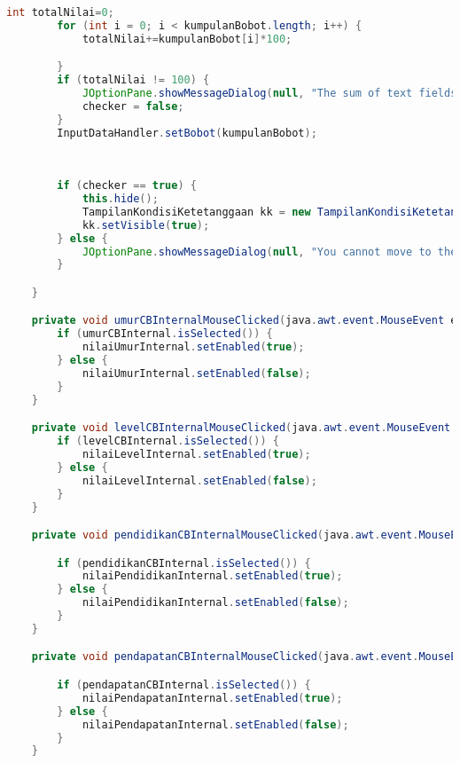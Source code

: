 \begin{lstlisting}[language=Java, caption=TampilanBobotKetetanggaan.java]
        int totalNilai=0;
        for (int i = 0; i < kumpulanBobot.length; i++) {
            totalNilai+=kumpulanBobot[i]*100;

        }
        if (totalNilai != 100) {
            JOptionPane.showMessageDialog(null, "The sum of text fields must 100%!");
            checker = false;
        }
        InputDataHandler.setBobot(kumpulanBobot);
        
        
        
        if (checker == true) {
            this.hide();
            TampilanKondisiKetetanggaan kk = new TampilanKondisiKetetanggaan();
            kk.setVisible(true);
        } else {
            JOptionPane.showMessageDialog(null, "You cannot move to the other page because you must fill text field first!");
        }

    }                                       

    private void umurCBInternalMouseClicked(java.awt.event.MouseEvent evt) {                                            
        if (umurCBInternal.isSelected()) {
            nilaiUmurInternal.setEnabled(true);
        } else {
            nilaiUmurInternal.setEnabled(false);
        }
    }                                           

    private void levelCBInternalMouseClicked(java.awt.event.MouseEvent evt) {                                             
        if (levelCBInternal.isSelected()) {
            nilaiLevelInternal.setEnabled(true);
        } else {
            nilaiLevelInternal.setEnabled(false);
        }
    }                                            

    private void pendidikanCBInternalMouseClicked(java.awt.event.MouseEvent evt) {                                                  

        if (pendidikanCBInternal.isSelected()) {
            nilaiPendidikanInternal.setEnabled(true);
        } else {
            nilaiPendidikanInternal.setEnabled(false);
        }
    }                                                 

    private void pendapatanCBInternalMouseClicked(java.awt.event.MouseEvent evt) {                                                  

        if (pendapatanCBInternal.isSelected()) {
            nilaiPendapatanInternal.setEnabled(true);
        } else {
            nilaiPendapatanInternal.setEnabled(false);
        }
    }                                                 


\end{lstlisting}
